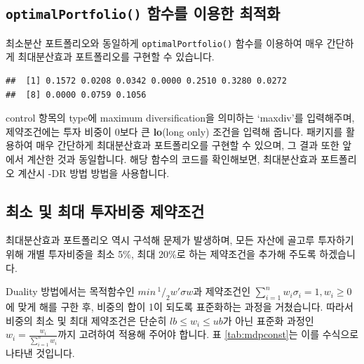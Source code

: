 \documentclass[12pt,]{book}
\newenvironment{Shaded}{\begin{snugshade}}{\end{snugshade}}
\newcommand{\DataTypeTok}[1]{\textcolor[rgb]{0.13,0.29,0.53}{#1}}
\newcommand{\DecValTok}[1]{\textcolor[rgb]{0.00,0.00,0.81}{#1}}
\newcommand{\KeywordTok}[1]{\textcolor[rgb]{0.13,0.29,0.53}{\textbf{#1}}}
\newcommand{\NormalTok}[1]{#1}
\newcommand{\OperatorTok}[1]{\textcolor[rgb]{0.81,0.36,0.00}{\textbf{#1}}}
\newcommand{\StringTok}[1]{\textcolor[rgb]{0.31,0.60,0.02}{#1}}
\begin{document}
\hypertarget{optimalportfolio----1}{%
\subsection{\texorpdfstring{\texttt{optimalPortfolio()} 함수를 이용한 최적화}{optimalPortfolio() 함수를 이용한 최적화}}\label{optimalportfolio----1}}

최소분산 포트폴리오와 동일하게 \texttt{optimalPortfolio()} 함수를 이용하여 매우 간단하게 최대분산효과 포트폴리오를 구현할 수 있습니다.

\begin{Shaded}
\end{Shaded}

\begin{verbatim}
##  [1] 0.1572 0.0208 0.0342 0.0000 0.2510 0.3280 0.0272
##  [8] 0.0000 0.0759 0.1056
\end{verbatim}

control 항목의 type에 maximum diversification을 의미하는 `maxdiv'를 입력해주며, 제약조건에는 투자 비중이 0보다 큰 \textbf{lo}(long only) 조건을 입력해 줍니다. 패키지를 활용하여 매우 간단하게 최대분산효과 포트폴리오를 구현할 수 있으며, 그 결과 또한 앞에서 계산한 것과 동일합니다. 해당 함수의 코드를 확인해보면, 최대분산효과 포트폴리오 계산시 -DR 방법 방법을 사용합니다.

\hypertarget{section-74}{%
\subsection{최소 및 최대 투자비중 제약조건}\label{section-74}}

최대분산효과 포트폴리오 역시 구석해 문제가 발생하며, 모든 자산에 골고루 투자하기 위해 개별 투자비중을 최소 5\%, 최대 20\%로 하는 제약조건을 추가해 주도록 하겠습니다.

Duality 방법에서는 목적함수인 \(min\,^1/_2w'\sigma w\)과 제약조건인 \(\sum_{i=1}^n w_i \sigma_i = 1, w_i \ge 0\)에 맞게 해를 구한 후, 비중의 합이 1이 되도록 표준화하는 과정을 거쳤습니다. 따라서 비중의 최소 및 최대 제약조건은 단순히 \(lb \le w_i \le ub\)가 아닌 표준화 과정인 \(w_i = \frac{w_i}{\sum_{i=1}^nw_i}\)까지 고려하여 적용해 주어야 합니다. 표 \ref{tab:mdpconst}는 이를 수식으로 나타낸 것입니다.
\end{document}

